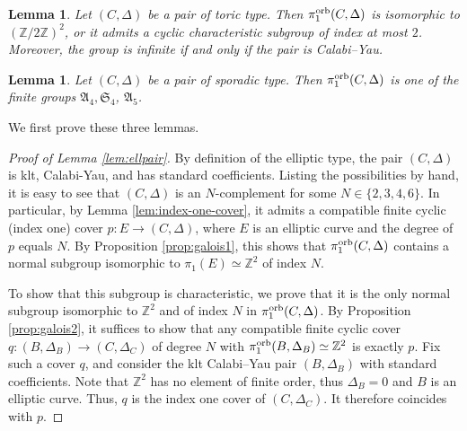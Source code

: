 \documentclass{amsart}
\newcommand{\zz}{\mathbb{Z}}
\newtheorem{lemma}[theorem]{Lemma}
\theoremstyle{definition}
\theoremstyle{remark}
\numberwithin{equation}{section}
\begin{document}
\begin{lemma}\label{lem:toricpair}
    Let $(C,\Delta)$ be a pair of toric type. Then $\pi_1^{\rm orb}(C,\Delta)$ is isomorphic to $(\zz/2\zz)^2$, or it admits a cyclic characteristic subgroup of index at most $2$. %
    Moreover, the group is infinite if and only if the pair is Calabi--Yau.
\end{lemma}

\begin{lemma}\label{lem:sporpair}
    Let $(C,\Delta)$ be a pair of sporadic type. Then $\pi_1^{\rm orb}(C,\Delta)$ is one of the finite groups $\mathfrak{A}_4,\mathfrak{S}_4$, $\mathfrak{A}_5$.
\end{lemma}

We first prove these three lemmas.

\begin{proof}[Proof of Lemma \ref{lem:ellpair}]
By definition of the elliptic type, the pair $(C,\Delta)$ is klt, Calabi-Yau, and has standard coefficients. Listing the possibilities by hand, it is easy to see that $(C,\Delta)$ is an $N$-complement for some $N\in\{2,3,4,6\}$. In particular, by Lemma \ref{lem:index-one-cover}, it admits a compatible finite cyclic (index one) cover $p:E\to (C,\Delta)$, where $E$ is an elliptic curve and the degree of $p$ equals $N$.
By Proposition \ref{prop:galois1}, this shows that $\pi_1^{\rm orb}(C,\Delta)$ contains a normal subgroup isomorphic to $\pi_1(E)\simeq\zz^2$ of index $N$.

To show that this subgroup is characteristic, we prove that it is the only normal subgroup isomorphic to $\zz^2$ and of index $N$ in $\pi_1^{\rm orb}(C,\Delta)$. By Proposition \ref{prop:galois2}, it suffices to show that any compatible finite cyclic cover $q:(B,\Delta_B)\to (C,\Delta_C)$ of degree $N$ with $\pi_1^{\rm orb}(B,\Delta_B)\simeq\zz^2$ is exactly $p$. Fix such a cover $q$, and consider the klt Calabi--Yau pair $(B,\Delta_B)$ with standard coefficients. Note that $\zz^2$ has no element of finite order, thus $\Delta_B=0$ and $B$ is an elliptic curve. Thus, $q$ is the index one cover of $(C,\Delta_C)$. It therefore coincides with $p$.
\end{proof}
\end{document}

